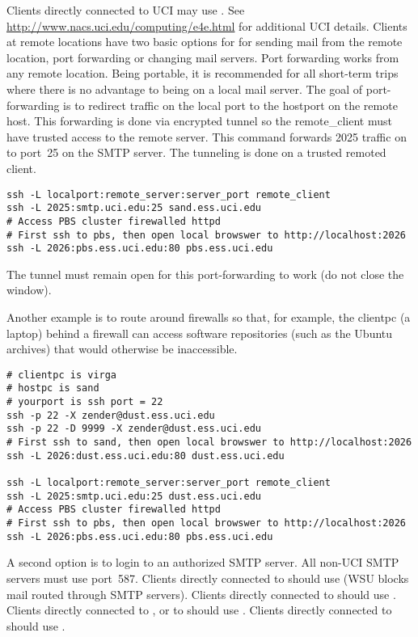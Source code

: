 \documentclass[12pt,twoside]{article}
\begin{document}
Clients directly connected to UCI may use .  
See \url{http://www.nacs.uci.edu/computing/e4e.html} for additional
UCI details.
Clients at remote locations have two basic options for for sending
mail from the remote location, port forwarding or changing mail
servers.
Port forwarding works from any remote location.
Being portable, it is recommended for all short-term trips where
there is no advantage to being on a local mail server.
The goal of port-forwarding is to redirect traffic on the local port 
to the hostport on the remote host.
This forwarding is done via encrypted tunnel so the remote\_client must
have trusted access to the remote server.
This command forwards 2025 traffic on  
to port~25 on the SMTP server.
The tunneling is done on a trusted remoted client.
\begin{verbatim}
ssh -L localport:remote_server:server_port remote_client
ssh -L 2025:smtp.uci.edu:25 sand.ess.uci.edu
# Access PBS cluster firewalled httpd 
# First ssh to pbs, then open local browswer to http://localhost:2026
ssh -L 2026:pbs.ess.uci.edu:80 pbs.ess.uci.edu
\end{verbatim}
The tunnel must remain open for this port-forwarding to work
(do not close the window).

Another example is to route around firewalls so that, for example,
the clientpc (a laptop) behind a firewall can access software
repositories (such as the Ubuntu archives) that would otherwise be
inaccessible.
\begin{verbatim}
# clientpc is virga
# hostpc is sand
# yourport is ssh port = 22
ssh -p 22 -X zender@dust.ess.uci.edu
ssh -p 22 -D 9999 -X zender@dust.ess.uci.edu
# First ssh to sand, then open local browswer to http://localhost:2026
ssh -L 2026:dust.ess.uci.edu:80 dust.ess.uci.edu

ssh -L localport:remote_server:server_port remote_client
ssh -L 2025:smtp.uci.edu:25 dust.ess.uci.edu
# Access PBS cluster firewalled httpd 
# First ssh to pbs, then open local browswer to http://localhost:2026
ssh -L 2026:pbs.ess.uci.edu:80 pbs.ess.uci.edu
\end{verbatim}

A second option is to login to an authorized SMTP server.
All non-UCI SMTP servers must use port~587.
Clients directly connected to  should use
 (WSU blocks mail routed through
 SMTP servers).
Clients directly connected to  should use
.
Clients directly connected to , or to
 should use .
Clients directly connected to  should use
.
\end{document}
